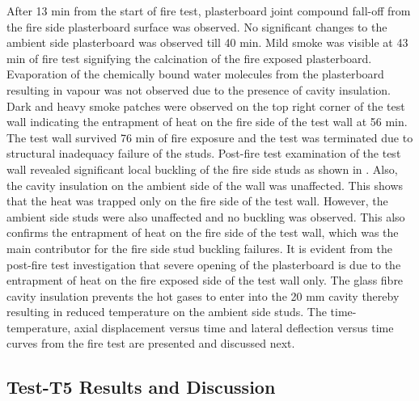 After 13 min from the start of fire test, plasterboard joint compound fall-off from the fire side plasterboard surface was observed. No significant changes to the ambient side plasterboard was observed till 40 min. Mild smoke was visible at 43 min of fire test signifying the calcination of the fire exposed plasterboard. Evaporation of the chemically bound water molecules from the plasterboard resulting in vapour was not observed due to the presence of cavity insulation. Dark and heavy smoke patches were observed on the top right corner of the test wall indicating the entrapment of heat on the fire side of the test wall at 56 min. The test wall survived 76 min of fire exposure and the test was terminated due to structural inadequacy failure of the studs. Post-fire test examination of the test wall revealed significant local buckling of the fire side studs as shown in . Also, the cavity insulation on the ambient side of the wall was unaffected. This shows that the heat was trapped only on the fire side of the test wall. However, the ambient side studs were also unaffected and no buckling was observed. This also confirms the entrapment of heat on the fire side of the test wall, which was the main contributor for the fire side stud buckling failures. It is evident from the post-fire test investigation that severe opening of the plasterboard is due to the entrapment of heat on the fire exposed side of the test wall only. The glass fibre cavity insulation prevents the hot gases to enter into the 20 mm cavity thereby resulting in reduced temperature on the ambient side studs. The time-temperature, axial displacement versus time and lateral deflection versus time curves from the fire test are presented and discussed next.

\subsection{Test-T5 Results and Discussion}

